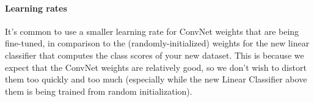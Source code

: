 \paragraph*{Learning rates} It’s common to use a smaller learning rate for ConvNet weights that are being fine-tuned, in comparison to the (randomly-initialized) weights for the new linear classifier that computes the class scores of your new dataset. This is because we expect that the ConvNet weights are relatively good, so we don’t wish to distort them too quickly and too much (especially while the new Linear Classifier above them is being trained from random initialization).